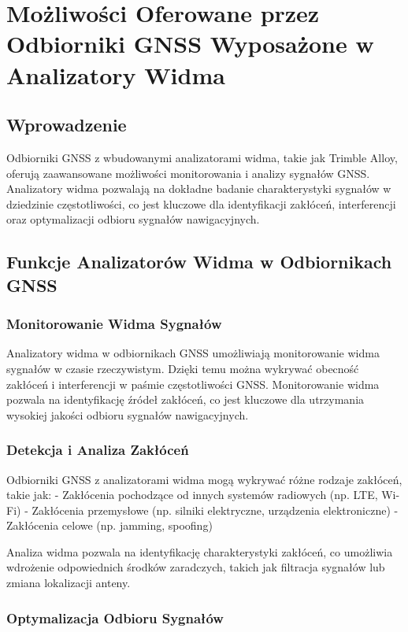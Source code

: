 \section{Możliwości Oferowane przez Odbiorniki GNSS Wyposażone w Analizatory Widma}

\subsection{Wprowadzenie}

Odbiorniki GNSS z wbudowanymi analizatorami widma, takie jak Trimble Alloy, oferują zaawansowane możliwości monitorowania i analizy sygnałów GNSS. Analizatory widma pozwalają na dokładne badanie charakterystyki sygnałów w dziedzinie częstotliwości, co jest kluczowe dla identyfikacji zakłóceń, interferencji oraz optymalizacji odbioru sygnałów nawigacyjnych.

\subsection{Funkcje Analizatorów Widma w Odbiornikach GNSS}

\subsubsection{Monitorowanie Widma Sygnałów}

Analizatory widma w odbiornikach GNSS umożliwiają monitorowanie widma sygnałów w czasie rzeczywistym. Dzięki temu można wykrywać obecność zakłóceń i interferencji w paśmie częstotliwości GNSS. Monitorowanie widma pozwala na identyfikację źródeł zakłóceń, co jest kluczowe dla utrzymania wysokiej jakości odbioru sygnałów nawigacyjnych.

\subsubsection{Detekcja i Analiza Zakłóceń}

Odbiorniki GNSS z analizatorami widma mogą wykrywać różne rodzaje zakłóceń, takie jak:
- Zakłócenia pochodzące od innych systemów radiowych (np. LTE, Wi-Fi)
- Zakłócenia przemysłowe (np. silniki elektryczne, urządzenia elektroniczne)
- Zakłócenia celowe (np. jamming, spoofing)

Analiza widma pozwala na identyfikację charakterystyki zakłóceń, co umożliwia wdrożenie odpowiednich środków zaradczych, takich jak filtracja sygnałów lub zmiana lokalizacji anteny.

\subsubsection{Optymalizacja Odbioru Sygnałów}


